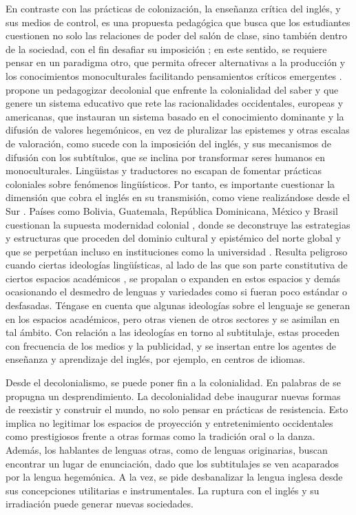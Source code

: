 \documentclass[spanish]{textolivre}
\begin{document}
En contraste con las prácticas de colonización, la enseñanza crítica del inglés, y sus medios de control, es una propuesta pedagógica que busca que los estudiantes cuestionen no solo las relaciones de poder del salón de clase, sino también dentro de la sociedad, con el fin desafiar su imposición \cite{despagne_modernidad_2016}; en este sentido, se requiere pensar en un paradigma otro, que permita ofrecer alternativas a la producción y los conocimientos monoculturales facilitando pensamientos críticos emergentes \cite{mignolo2005paradigma}. \textcite{walsh_pedagogias_2013} propone un pedagogizar decolonial que enfrente la colonialidad del saber y que genere un sistema educativo que rete las racionalidades occidentales, europeas y americanas, que instauran un sistema basado en el conocimiento dominante y la difusión de valores hegemónicos, en vez de pluralizar las epistemes y otras escalas de valoración, como sucede con la imposición del inglés, y sus mecanismos de difusión con los subtítulos, que se inclina por transformar seres humanos en monoculturales. Lingüistas y traductores no escapan de fomentar prácticas coloniales sobre fenómenos lingüísticos. Por tanto, es importante cuestionar la dimensión que cobra el inglés en su transmisión, como viene realizándose desde el Sur \cite{mastrella-de-andrade_abandonamos_2020}. Países como Bolivia, Guatemala, República Dominicana, México y Brasil cuestionan la supuesta modernidad colonial \cite{zapata_decolonial_2018}, donde se deconstruye las estrategias y estructuras que proceden del dominio cultural y epistémico del norte global \cite{fandino-parra_decolonizing_2021} y que se perpetúan incluso en instituciones como la universidad \cite{castro2007decolonizar}. Resulta peligroso cuando ciertas ideologías lingüísticas, al lado de las que son parte constitutiva de ciertos espacios académicos \cite{arias_loaiza_ideologias_2022}, se propalan o expanden en estos espacios y demás ocasionando el desmedro de lenguas y variedades como si fueran poco estándar o desfasadas. Téngase en cuenta que algunas ideologías sobre el lenguaje se generan en los espacios académicos, pero otras vienen de otros sectores y se asimilan en tal ámbito. Con relación a las ideologías en torno al subtitulaje, estas proceden con frecuencia de los medios y la publicidad, y se insertan entre los agentes de enseñanza y aprendizaje del inglés, por ejemplo, en centros de idiomas.

Desde el decolonialismo, se puede poner fin a la colonialidad. En palabras de \textcite{baum2019decir} se propugna un desprendimiento. La decolonialidad debe inaugurar nuevas formas de reexistir y construir el mundo, no solo pensar en prácticas de resistencia. Esto implica no legitimar los espacios de proyección y entretenimiento occidentales como prestigiosos frente a otras formas como la tradición oral o la danza. Además, los hablantes de lenguas otras, como de lenguas originarias, buscan encontrar un lugar de enunciación, dado que los subtitulajes se ven acaparados por la lengua hegemónica. A la vez, se pide desbanalizar la lengua inglesa desde sus concepciones utilitarias e instrumentales. La ruptura con el inglés y su irradiación puede generar nuevas sociedades.
\end{document}
